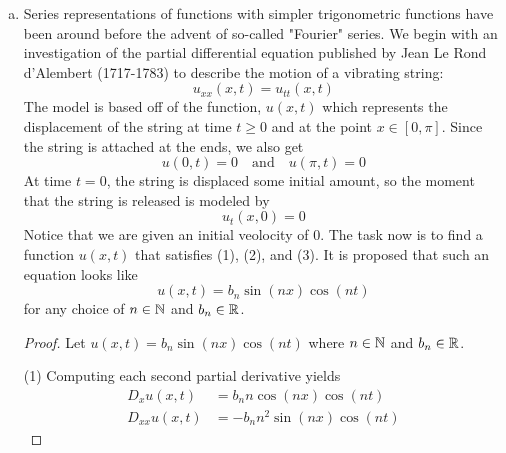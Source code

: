 \begin{problem}


    \begin{enumerate}[(a)]

        \item Series representations of functions with simpler trigonometric functions have been around before the advent of so-called "Fourier" series. We begin with an investigation of the partial differential equation published by Jean Le Rond d'Alembert (1717-1783) to describe the motion of a vibrating string:
            \begin{equation}
            \label{problem1:1}
                u_{xx}(x,t) = u_{tt}(x,t) 
            \end{equation} 
            The model is based off of the function, $u(x,t)$ which represents the displacement of the string at time $t \geq 0$ and at the point $x \in [0,\pi]$. 
            Since the string is attached at the ends, we also get 
            \begin{equation}
            \label{problem1:2}
                u(0,t) = 0 \quad \text{and} \quad u(\pi,t) = 0
            \end{equation}
            At time $t=0$, the string is displaced some initial amount, so the moment that the string is released is modeled by
            \begin{equation}
            \label{problem1:3}
                u_t (x,0) = 0
            \end{equation}
            Notice that we are given an initial veolocity of 0. The task now is to find a function $u(x,t)$ that satisfies (1), (2), and (3). It is proposed that such an equation looks like 
            \begin{equation}
            \label{equation:wave}
                u(x,t) = b_n \sin(nx) \cos(nt) 
            \end{equation}
            for any choice of $n \in \mathbb{N}$ and $b_n \in \mathbb{R}$.
            \begin{proof} Let $u(x,t) = b_n \sin(nx) \cos(nt)$ where $n \in \mathbb{N}$ and $b_n \in \mathbb{R}$.

                (1) Computing each second partial derivative yields
                \begin{align}
                D_{x} u(x,t) &= b_n n \cos(nx) \cos(nt) \\
                D_{xx} u(x,t) &= -b_n n^2 \sin(nx) \cos(nt)
                \end{align}
                

\end{proof}
\end{enumerate}
\end{problem}
